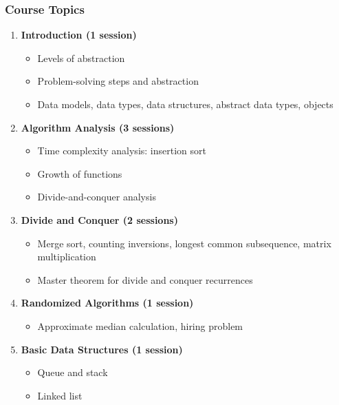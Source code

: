 \documentclass[12pt]{article}
\begin{document}
\subsubsection*{Course Topics}
\begin{enumerate}
    \item \textbf{Introduction (1 session)}
        \begin{itemize}
            \item Levels of abstraction
            \item Problem-solving steps and abstraction
            \item Data models, data types, data structures, abstract data types, objects
        \end{itemize}
    
    \item \textbf{Algorithm Analysis (3 sessions)}
        \begin{itemize}
            \item Time complexity analysis: insertion sort
            \item Growth of functions
            \item Divide-and-conquer analysis
        \end{itemize}
    
    \item \textbf{Divide and Conquer (2 sessions)}
        \begin{itemize}
            \item Merge sort, counting inversions, longest common subsequence, matrix multiplication
            \item Master theorem for divide and conquer recurrences
        \end{itemize}
    
    \item \textbf{Randomized Algorithms (1 session)}
        \begin{itemize}
            \item Approximate median calculation, hiring problem
        \end{itemize}
    
    \item \textbf{Basic Data Structures (1 session)}
        \begin{itemize}
            \item Queue and stack
            \item Linked list
        \end{itemize}
    

\end{enumerate}
\end{document}
